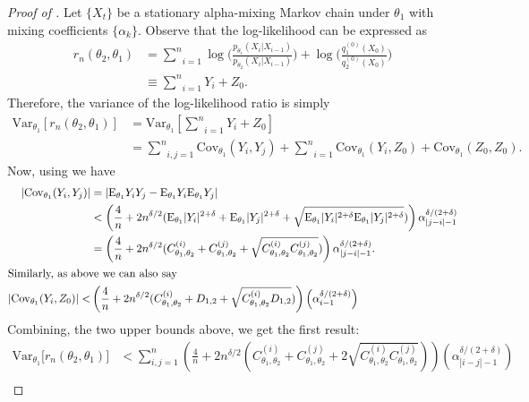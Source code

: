 \documentclass[11pt]{amsart}
\newcommand{\E}{\mathrm{E}}
\newcommand{\Var}{\mathrm{Var}}
\newcommand{\Cov}{\mathrm{Cov}}
\begin{document}
\begin{proof}[Proof of ]
 Let $\{X_t\}$ be a stationary alpha-mixing Markov chain under $\theta_1$ with mixing coefficients $\{\alpha_k\}$. Observe that the log-likelihood can be expressed as
\begin{align*}
   r_n(\theta_2,\theta_1) & =\underset{i=1}{\sum^{n}} \log \bigg( \frac{ p_{\theta_1}(X_i|X_{i-1}) } { p_{\theta_2}(X_i|X_{i-1}) } \bigg) + \log \bigg(\frac{q^{(0)}_{1}(X_0)}{q^{(0)}_2(X_0)}\bigg)\\
     & \equiv \underset{i=1}{\sum^n} Y_i+Z_0.
\end{align*}
Therefore, the variance of the log-likelihood ratio is simply
\begin{align*}
  \Var_{\theta_1} \left[ r_n(\theta_2,\theta_1) \right] & =\Var_{\theta_1}\left[\underset{i=1}{\sum^n} Y_i+Z_0\right]\\
     & =\underset{i,j=1}{\sum^n} \Cov_{\theta_1}(Y_i,Y_j) + \underset{i=1}{\sum^n} \Cov_{\theta_1}(Y_i,Z_0) + \Cov_{\theta_1}(Z_0,Z_0).
\end{align*}
%
Now, using  we have
\begin{align*}
    |\Cov_{\theta_1}(Y_i,Y_j)| & =|\E_{\theta_1} Y_iY_j-\E_{\theta_1} Y_i\E_{\theta_1} Y_j|\\
     & < \left(\frac{4}{n}+2n^{\delta/2}(\E_{\theta_1}|Y_i|^{2+\delta}+\E_{\theta_1}|Y_j|^{2+\delta}+\sqrt{\E_{\theta_1}|Y_i|^{2+\delta}\E_{\theta_1}|Y_j|^{2+\delta}})\right)\alpha_{|j-i|-1}^{\delta/(2+\delta)}\\
     & = \left(\frac{4}{n}+2n^{\delta/2}(C_{\theta_1,\theta_2}^{(i)}+C_{\theta_1,\theta_2}^{(j)}+\sqrt{C_{\theta_1,\theta_2}^{(i)}C_{\theta_1,\theta_2}^{(j)}})\right)\alpha_{|j-i|-1}^{\delta/(2+\delta)}.\\
     \intertext{Similarly, as above we can also say}
    |\Cov_{\theta_1}(Y_i,Z_0)|< & \left(\frac{4}{n}+2n^{\delta/2}(C_{\theta_1,\theta_2}^{(i)}+D_{1,2}+\sqrt{C_{\theta_1,\theta_2}^{(i)}D_{1,2}})\right)\left(\alpha_{i-1}^{\delta/(2+\delta)}\right)
\end{align*}
%
Combining, the two upper bounds above, we get the first result:
\begin{align*}
    \Var_{\theta_1} \bigg[ r_n(\theta_2,\theta_1) \bigg] & < \sum_{i,j=1}^n\left(\frac{4}{n}+2n^{\delta/2}(C_{\theta_1,\theta_2}^{(i)}+C_{\theta_1,\theta_2}^{(j)}+2\sqrt{C_{\theta_1,\theta_2}^{(i)}C_{\theta_1,\theta_2}^{(j)}})\right)  \left(\alpha_{|i-j|-1}^{\delta/(2+\delta)}\right)\\
    \nonumber

\end{align*}
\end{proof}
\end{document}
